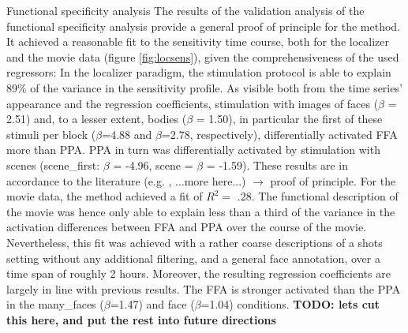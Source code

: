 \documentclass[a4paper, 12pt]{scrreprt}
\begin{document}
\bigskip
Functional specificity analysis \newline
The results of the validation analysis of the functional specificity analysis provide a general proof of principle for the method. It achieved a reasonable fit to the sensitivity time course, both for the localizer and the movie data (figure \ref{fig:locsens}), given the comprehensiveness of the used regressors: In the localizer paradigm, the stimulation protocol is able to explain 89\% of the variance in the sensitivity profile. As visible both from the time series' appearance and the regression coefficients, stimulation with images of faces ($\beta$ = 2.51) and, to a lesser extent, bodies ($\beta$ = 1.50), in particular the first of these stimuli per block ($\beta$=4.88 and $\beta$=2.78, respectively), differentially activated FFA more than PPA. PPA in turn was differentially activated by stimulation with scenes (scene\_first: $\beta$ = -4.96, scene = $\beta$ = -1.59). These results are in accordance to the literature (e.g. \cite{fox2009defining}, ...more here...) $\rightarrow$ proof of principle. \newline
For the movie data, the method achieved a fit of $R^2 =$ .28. The functional description of the movie was hence only able to explain less than a third of the variance in the activation differences between FFA and PPA over the course of the movie. Nevertheless, this fit was achieved with a rather coarse descriptions of a shots setting without any additional filtering, and a general face annotation, over a time span of roughly 2 hours. Moreover, the resulting regression coefficients are largely in line with previous results. The FFA is stronger activated than the PPA in the many\_faces ($\beta$=1.47) and face ($\beta$=1.04) conditions. \textbf{TODO: lets cut this here, and put the rest into future directions}
\end{document}
